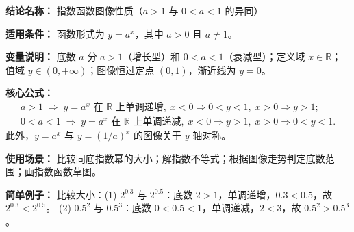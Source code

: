 \textbf{结论名称：} 指数函数图像性质（$a>1$ 与 $0<a<1$ 的异同）

\textbf{适用条件：} 函数形式为 $y=a^x$，其中 $a>0$ 且 $a\neq 1$。

\textbf{变量说明：} 底数 $a$ 分 $a>1$（增长型）和 $0<a<1$（衰减型）；定义域 $x\in\mathbb{R}$；值域 $y\in(0,+\infty)$；图像恒过定点 $(0,1)$，渐近线为 $y=0$。

\textbf{核心公式：}
\[
\boxed{
\begin{array}{l}
a>1 \;\Longrightarrow\; y=a^x \text{ 在 } \mathbb{R} \text{ 上单调递增},\; x<0\Rightarrow 0<y<1,\; x>0\Rightarrow y>1;\\[4pt]
0<a<1 \;\Longrightarrow\; y=a^x \text{ 在 } \mathbb{R} \text{ 上单调递减},\; x<0\Rightarrow y>1,\; x>0\Rightarrow 0<y<1.
\end{array}
}
\]
此外，$y=a^x$ 与 $y=(1/a)^x$ 的图像关于 $y$ 轴对称。

\textbf{使用场景：} 比较同底指数幂的大小；解指数不等式；根据图像走势判定底数范围；画指数函数草图。

\textbf{简单例子：}
比较大小：(1) $2^{0.3}$ 与 $2^{0.5}$：底数 $2>1$，单调递增，$0.3<0.5$，故 $2^{0.3}<2^{0.5}$。
(2) $0.5^2$ 与 $0.5^3$：底数 $0<0.5<1$，单调递减，$2<3$，故 $0.5^2 > 0.5^3$。